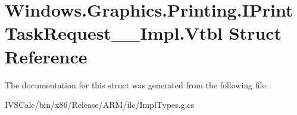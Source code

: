 \hypertarget{struct_windows_1_1_graphics_1_1_printing_1_1_i_print_task_request_____impl_1_1_vtbl}{}\section{Windows.\+Graphics.\+Printing.\+I\+Print\+Task\+Request\+\_\+\+\_\+\+Impl.\+Vtbl Struct Reference}
\label{struct_windows_1_1_graphics_1_1_printing_1_1_i_print_task_request_____impl_1_1_vtbl}


The documentation for this struct was generated from the following file\+:\begin{DoxyCompactItemize}
\item 
I\+V\+S\+Calc/bin/x86/\+Release/\+A\+R\+M/ilc/Impl\+Types.\+g.\+cs\end{DoxyCompactItemize}
